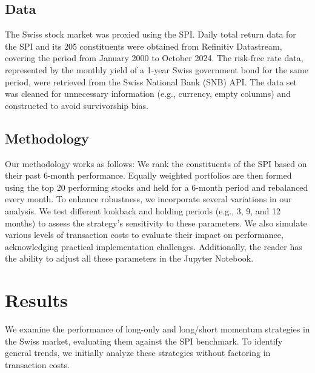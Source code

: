 \documentclass[a4paper,12pt]{article}
\begin{document}
    \subsection{Data}
    The Swiss stock market was proxied using the SPI. Daily total return data for the SPI and its 205 constituents were obtained from Refinitiv Datastream, covering the period from January 2000 to October 2024. The risk-free rate data, represented by the monthly yield of a 1-year Swiss government bond for the same period, were retrieved from the Swiss National Bank (SNB) API. The data set was cleaned for unnecessary information (e.g., currency, empty columns) and constructed to avoid survivorship bias.
    
    \subsection{Methodology}
    Our methodology works as follows: We rank the constituents of the SPI based on their past 6-month performance. Equally weighted portfolios are then formed using the top 20 performing stocks and held for a 6-month period and rebalanced every month. To enhance robustness, we incorporate several variations in our analysis. We test different lookback and holding periods (e.g., 3, 9, and 12 months) to assess the strategy's sensitivity to these parameters. We also simulate various levels of transaction costs to evaluate their impact on performance, acknowledging practical implementation challenges. Additionally, the reader has the ability to adjust all these parameters in the Jupyter Notebook. 
    
    
    
    \newpage
    
    \section{Results}
    We examine the performance of long-only and long/short momentum strategies in the Swiss market, evaluating them against the SPI benchmark. To identify general trends, we initially analyze these strategies without factoring in transaction costs.
    
\end{document}
